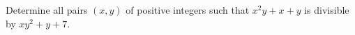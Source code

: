 Determine all pairs $(x,y)$ of positive integers such that $x^2 y + x + y$ is divisible by $xy^2 + y + 7$.
